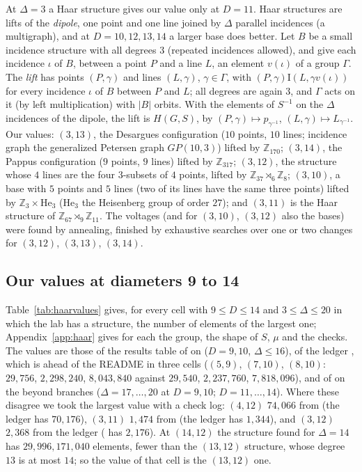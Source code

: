 \documentclass[11pt]{amsart}
\theoremstyle{definition}
\theoremstyle{remark}
\newcommand{\I}{\mathrel{\mathrm{I}}}
\begin{document}
At $\Delta=3$ a Haar structure gives our value only at $D=11$. Haar structures are lifts of the \emph{dipole}, one point and one line joined by $\Delta$ parallel incidences (a multigraph), and at $D=10,12,13,14$ a larger base does better. Let $B$ be a small incidence structure with all degrees $3$ (repeated incidences allowed), and give each incidence $\iota$ of $B$, between a point $P$ and a line $L$, an element $v(\iota)$ of a group $\Gamma$. The \emph{lift} has points $(P,\gamma)$ and lines $(L,\gamma)$, $\gamma\in\Gamma$, with $(P,\gamma)\I(L,\gamma v(\iota))$ for every incidence $\iota$ of $B$ between $P$ and $L$; all degrees are again $3$, and $\Gamma$ acts on it (by left multiplication) with $|B|$ orbits. With the elements of $S^{-1}$ on the $\Delta$ incidences of the dipole, the lift is $H(G,S)$, by $(P,\gamma)\mapsto p_{\gamma^{-1}}$, $(L,\gamma)\mapsto L_{\gamma^{-1}}$. Our values: $(3,13)$, the Desargues configuration ($10$ points, $10$ lines; incidence graph the generalized Petersen graph $GP(10,3)$) lifted by $\mathbb{Z}_{170}$; $(3,14)$, the Pappus configuration ($9$ points, $9$ lines) lifted by $\mathbb{Z}_{317}$; $(3,12)$, the structure whose $4$ lines are the four $3$-subsets of $4$ points, lifted by $\mathbb{Z}_{37}\rtimes_6\mathbb{Z}_8$; $(3,10)$, a base with $5$ points and $5$ lines (two of its lines have the same three points) lifted by $\mathbb{Z}_3\times\mathrm{He}_3$ (He$_3$ the Heisenberg group of order $27$); and $(3,11)$ is the Haar structure of $\mathbb{Z}_{67}\rtimes_9\mathbb{Z}_{11}$. The voltages (and for $(3,10)$, $(3,12)$ also the bases) were found by annealing, finished by exhaustive searches over one or two changes for $(3,12)$, $(3,13)$, $(3,14)$.

\subsection{Our values at diameters 9 to 14}\label{ssec:haarvalues}

Table~\ref{tab:haarvalues} gives, for every cell with $9\le D\le 14$ and $3\le\Delta\le20$ in which the lab has a structure, the number of elements of the largest one; Appendix~\ref{app:haar} gives for each the group, the shape of $S$, $\mu$ and the checks. The values are those of the results table of  on  ($D=9,10$, $\Delta\le16$), of the ledger , which is ahead of the README in three cells ($(5,9)$, $(7,10)$, $(8,10)$: $29{,}756$, $2{,}298{,}240$, $8{,}043{,}840$ against $29{,}540$, $2{,}237{,}760$, $7{,}818{,}096$), and of  on the beyond branches ($\Delta=17,\dots,20$ at $D=9,10$; $D=11,\dots,14$). Where these disagree we took the largest value with a check log: $(4,12)$ $74{,}066$ from  (the ledger has $70{,}176$), $(3,11)$ $1{,}474$ from  (the ledger has $1{,}344$), and $(3,12)$ $2{,}368$ from the ledger ( has $2{,}176$). At $(14,12)$ the structure found for $\Delta=14$ has $29{,}996{,}171{,}040$ elements, fewer than the $(13,12)$ structure, whose degree $13$ is at most $14$; so the value of that cell is the $(13,12)$ one.
\end{document}
